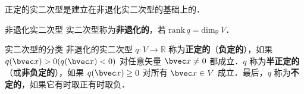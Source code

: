 正定的实二次型是建立在非退化实二次型的基础上的．
\begin{definition}{非退化实二次型}
实二次型称为\textbf{非退化的}，若 $\mathrm{rank}\,q=\mathrm{dim}_{\mathbb{R}}\,V$．
\end{definition}
\begin{definition}{实二次型的分类}
非退化的实二次型 $q:V\rightarrow\mathbb R$ 称为\textbf{正定的}（\textbf{负定的}），如果 $q(\bvec x)>0(q(\bvec x)<0)$ 对任意矢量 $\bvec x\neq0$ 都成立．$q$ 称为\textbf{半正定的}（或\textbf{非负定的}），如果 $q(\bvec x)\geq0$ 对所有 $\bvec x\in V$ 成立．最后，$q$ 称为\textbf{不定的}，如果它有时取正有时取负．
\end{definition}